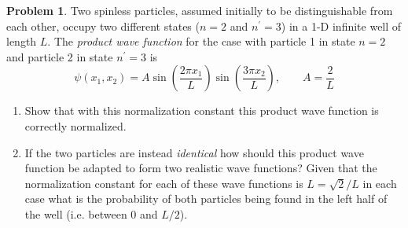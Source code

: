\documentclass[10pt]{article}
\theoremstyle{definition}
\newtheorem{problem}{Problem}
\begin{document}
\begin{problem}
Two spinless particles, assumed initially to be distinguishable from each other, occupy two different
states ($n=2$ and $n^\prime=3$) in a 1-D infinite well of length $L$. The \emph{product wave function} for the case with particle 1 in
state $n=2$ and particle 2 in state $n^\prime=3$ is
$$\psi(x_1,x_2)=A\sin\left(\frac{2\pi x_1}{L}\right)\sin\left(\frac{3\pi x_2}{L}\right),\qquad A=\frac{2}{L}$$
\begin{enumerate}[label=(\alph*)]
  \item Show that with this normalization constant this product wave function is correctly normalized.
  \item If the two particles are instead \emph{identical} how should this product wave function be adapted to form two
        realistic wave functions? Given that the normalization constant for each of these wave functions is $L=\sqrt{2}/L$
        in each case what is the probability of both particles being found in the left half of the well (i.e. between $0$ and $L/2$).
\end{enumerate}
\end{problem}
\end{document}
